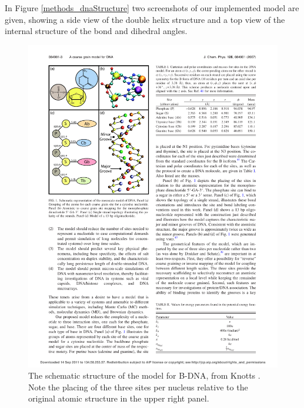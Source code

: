In Figure \ref{methods_dnaStructure} two screenshots of our implemented model are given, showing a side view of the double helix structure and a top view of the internal structure of the bond and dihedral angles.

\begin{figure}[h]
\begin{center}
\includegraphics{images/schematic_structure_knotts}
\caption{The schematic structure of the model for B-DNA, from Knotts \etal \cite{knotts2007coarse}. Note the placing of the three sites per nucleus relative to the original atomic structure in the upper right panel.}
\label{schematic_knotts}
\end{center}
\end{figure}

